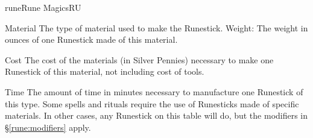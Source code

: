 \begin{college}[1.1]{rune}{Rune Magics}{RU}
\begin{Description}
\item[Material]
The type of material used to make the Runestick.  Weight: The weight
in ounces of one Runestick made of this material.
\item[Cost]
The cost of the materials (in Silver Pennies) necessary to make one
Runestick of this material, not including cost of tools.
\item[Time]
The amount of time in minutes necessary to manufacture one Runestick
of this type.  Some spells and rituals require the use of Runesticks
made of specific materials.  In other cases, any Runestick on this
table will do, but the modifiers in \S\ref{rune:modifiers} apply.
\end{Description}
\end{college}

